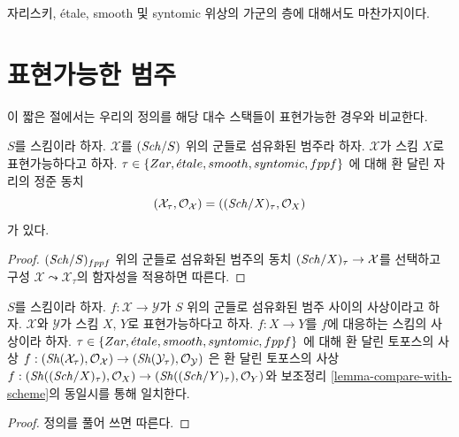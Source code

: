 \medskip\noindent
자리스키, \'etale, smooth 및 syntomic 위상의 가군의 층에 대해서도
마찬가지이다.



\section{표현가능한 범주}
\label{section-representable}

\noindent
이 짧은 절에서는 우리의 정의를 해당 대수 스택들이 표현가능한 경우와
비교한다.

\begin{lemma}
\label{lemma-compare-with-scheme}
$S$를 스킴이라 하자. $\mathcal{X}$를 $(\mathit{Sch}/S)$ 위의 군들로
섬유화된 범주라 하자. $\mathcal{X}$가 스킴 $X$로 표현가능하다고 하자.
$\tau \in \{Zar,\linebreak[0] \etale,\linebreak[0]
smooth,\linebreak[0] syntomic,\linebreak[0] fppf\}$
에 대해 환 달린 자리의 정준 동치
$$
(\mathcal{X}_\tau, \mathcal{O}_\mathcal{X}) =
((\mathit{Sch}/X)_\tau, \mathcal{O}_X)
$$
가 있다.
\end{lemma}

\begin{proof}
$(\mathit{Sch}/S)_{fppf}$ 위의 군들로 섬유화된 범주의 동치
$(\mathit{Sch}/X)_\tau \to \mathcal{X}$를 선택하고 구성
$\mathcal{X} \leadsto \mathcal{X}_\tau$의 함자성을 적용하면 따른다.
\end{proof}

\begin{lemma}
\label{lemma-compare-with-morphism-of-schemes}
$S$를 스킴이라 하자. $f : \mathcal{X} \to \mathcal{Y}$가 $S$ 위의
군들로 섬유화된 범주 사이의 사상이라고 하자.
$\mathcal{X}$와 $\mathcal{Y}$가 스킴 $X$, $Y$로 표현가능하다고 하자.
$f : X \to Y$를 $f$에 대응하는 스킴의 사상이라 하자.
$\tau \in \{Zar,\linebreak[0] \etale,\linebreak[0]
smooth,\linebreak[0] syntomic,\linebreak[0] fppf\}$
에 대해 환 달린 토포스의 사상
$f : (\mathop{\mathit{Sh}}\nolimits(\mathcal{X}_\tau), \mathcal{O}_\mathcal{X}) \to
(\mathop{\mathit{Sh}}\nolimits(\mathcal{Y}_\tau), \mathcal{O}_\mathcal{Y})$
은 환 달린 토포스의 사상
$f : (\mathop{\mathit{Sh}}\nolimits((\mathit{Sch}/X)_\tau), \mathcal{O}_X) \to 
(\mathop{\mathit{Sh}}\nolimits((\mathit{Sch}/Y)_\tau), \mathcal{O}_Y)$와 보조정리
\ref{lemma-compare-with-scheme}의 동일시를 통해 일치한다.
\end{lemma}

\begin{proof}
정의를 풀어 쓰면 따른다.
\end{proof}




